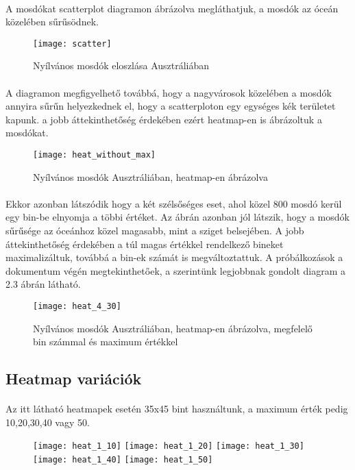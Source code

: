 	\paragraph{}
	A mosdókat scatterplot diagramon ábrázolva megláthatjuk, a mosdók az óceán közelében sűrűsödnek.
	\begin{figure}[!ht]
		\centering
			\texttt{[image: scatter]}
			\caption{Nyílvános mosdók eloszlása Ausztráliában}
	\end{figure}
	\paragraph{}
	A diagramon megfigyelhető továbbá, hogy a nagyvárosok közelében a mosdók annyira sűrűn helyezkednek el, hogy a scatterploton egy egységes kék területet kapunk. a jobb áttekinthetőség érdekében ezért heatmap-en is ábrázoltuk a mosdókat.
	\begin{figure}[!ht]
		\centering	
			\texttt{[image: heat\_without\_max]}
			\caption{Nyílvános mosdók Ausztráliában, heatmap-en ábrázolva}
	\end{figure}
	\paragraph{}
	Ekkor azonban látszódik hogy a két szélsőséges eset, ahol közel 800 mosdó kerül egy bin-be elnyomja a többi értéket. Az ábrán azonban jól látszik, hogy a mosdók sűrűsége az óceánhoz közel magasabb, mint a sziget belsejében. A jobb áttekinthetőség érdekében a túl magas értékkel rendelkező bineket maximalizáltuk, továbbá a bin-ek számát is megváltoztattuk. A próbálkozások a dokumentum végén megtekinthetőek, a szerintünk legjobbnak gondolt diagram a 2.3 ábrán látható.	
	\begin{figure}[!ht]
		\centering	
			\texttt{[image: heat\_4\_30]}
			\caption{Nyílvános mosdók Ausztráliában, heatmap-en ábrázolva, megfelelő bin számmal és maximum értékkel}
	\end{figure}
	\clearpage
	\subsection{Heatmap variációk}
	\paragraph{}
	Az itt látható heatmapek esetén 35x45 bint használtunk, a maximum érték pedig 10,20,30,40 vagy 50. 
	\begin{figure}[h]
		\begin{multicols}{2}
			\texttt{[image: heat\_1\_10]}
			\texttt{[image: heat\_1\_20]}
			\texttt{[image: heat\_1\_30]}
			\texttt{[image: heat\_1\_40]}
			\texttt{[image: heat\_1\_50]}		
		\end{multicols}
	\end{figure}
	\clearpage	
